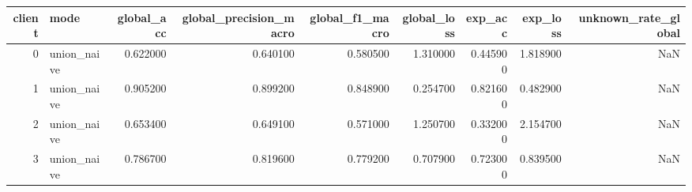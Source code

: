 \begin{tabular}{rlrrrrrrr}
\toprule
client & mode & global_acc & global_precision_macro & global_f1_macro & global_loss & exp_acc & exp_loss & unknown_rate_global \\
\midrule
0 & union_naive & 0.622000 & 0.640100 & 0.580500 & 1.310000 & 0.445900 & 1.818900 & NaN \\
1 & union_naive & 0.905200 & 0.899200 & 0.848900 & 0.254700 & 0.821600 & 0.482900 & NaN \\
2 & union_naive & 0.653400 & 0.649100 & 0.571000 & 1.250700 & 0.332000 & 2.154700 & NaN \\
3 & union_naive & 0.786700 & 0.819600 & 0.779200 & 0.707900 & 0.723000 & 0.839500 & NaN \\
\bottomrule
\end{tabular}
